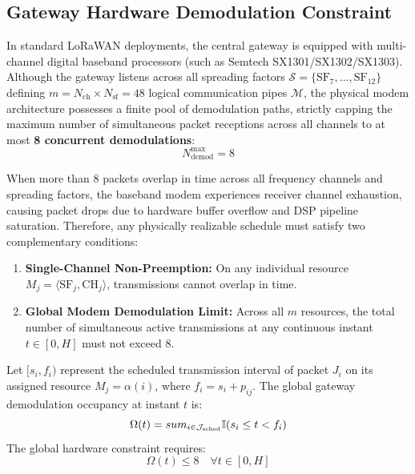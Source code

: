 \documentclass{article}
\begin{document}
\subsection{Gateway Hardware Demodulation Constraint}
\label{subsec:hardware_limit}
In standard LoRaWAN deployments, the central gateway is equipped with multi-channel digital baseband processors (such as Semtech SX1301/SX1302/SX1303). Although the gateway listens across all spreading factors $\mathcal{S} = \{\text{SF}_7, \dots, \text{SF}_{12}\}$ defining $m = N_{\text{ch}} \times N_{\text{sf}} = 48$ logical communication pipes $\mathcal{M}$, the physical modem architecture possesses a finite pool of demodulation paths, strictly capping the maximum number of simultaneous packet receptions across all channels to at most \textbf{8 concurrent demodulations}:
\begin{equation}
N_{\text{demod}}^{\max} = 8
\end{equation}

When more than 8 packets overlap in time across all frequency channels and spreading factors, the baseband modem experiences receiver channel exhaustion, causing packet drops due to hardware buffer overflow and DSP pipeline saturation. Therefore, any physically realizable schedule must satisfy two complementary conditions:
\begin{enumerate}
    \item \textbf{Single-Channel Non-Preemption:} On any individual resource $M_j = \langle \text{SF}_j, \text{CH}_j \rangle$, transmissions cannot overlap in time.
    \item \textbf{Global Modem Demodulation Limit:} Across all $m$ resources, the total number of simultaneous active transmissions at any continuous instant $t \in [0, H]$ must not exceed 8.
\end{enumerate}

Let $[s_i, f_i)$ represent the scheduled transmission interval of packet $J_i$ on its assigned resource $M_j = \alpha(i)$, where $f_i = s_i + p_{ij}$. The global gateway demodulation occupancy at instant $t$ is:
\begin{equation}
\Omega(t) = \\sum_{i \in \mathcal{J}_{\text{sched}}} \mathbb{I}(s_i \le t < f_i)
\end{equation}
The global hardware constraint requires:
\begin{equation}
\label{eq:demod_constraint}
\Omega(t) \le 8 \quad \forall t \in [0, H]
\end{equation}
\end{document}
